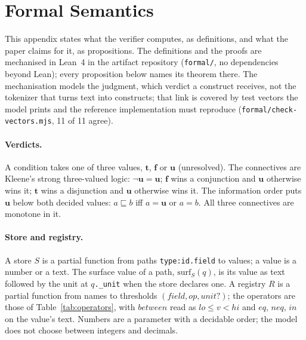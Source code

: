 \documentclass[11pt,a4paper]{article}
\begin{document}
\section{Formal Semantics}
\label{app:formal}

This appendix states what the verifier computes, as definitions, and what the paper claims for it, as propositions. The definitions and the proofs are mechanised in Lean~4 in the artifact repository (\texttt{formal/}, no dependencies beyond Lean); every proposition below names its theorem there. The mechanisation models the judgment, which verdict a construct receives, not the tokenizer that turns text into constructs; that link is covered by test vectors the model prints and the reference implementation must reproduce (\texttt{formal/check-vectors.mjs}, 11 of 11 agree).

\paragraph{Verdicts.} A condition takes one of three values, $\mathbf{t}$, $\mathbf{f}$ or $\mathbf{u}$ (unresolved). The connectives are Kleene's strong three-valued logic: $\neg\mathbf{u}=\mathbf{u}$; $\mathbf{f}$ wins a conjunction and $\mathbf{u}$ otherwise wins it; $\mathbf{t}$ wins a disjunction and $\mathbf{u}$ otherwise wins it. The information order puts $\mathbf{u}$ below both decided values: $a \sqsubseteq b$ iff $a=\mathbf{u}$ or $a=b$. All three connectives are monotone in it.

\paragraph{Store and registry.} A store $S$ is a partial function from paths \texttt{type:id.field} to values; a value is a number or a text. The surface value of a path, $\mathrm{surf}_S(q)$, is its value as text followed by the unit at $q$\texttt{.\_unit} when the store declares one. A registry $R$ is a partial function from names to thresholds $(\mathit{field}, \mathit{op}, \mathit{unit}?)$; the operators are those of Table~\ref{tab:operators}, with $\mathit{between}$ read as $\mathit{lo} \le v < \mathit{hi}$ and $\mathit{eq}$, $\mathit{neq}$, $\mathit{in}$ on the value's text. Numbers are a parameter with a decidable order; the model does not choose between integers and decimals.
\end{document}
